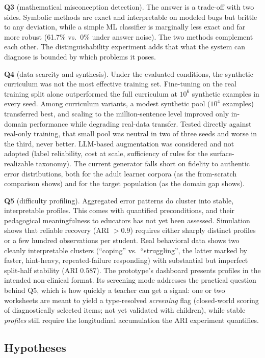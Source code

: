 \textbf{Q3} (mathematical misconception detection). The answer is a trade-off with two sides. Symbolic methods are exact and interpretable on modeled bugs but brittle to any deviation, while a simple ML classifier is marginally less exact and far more robust (61.7\% vs.\ 0\% under answer noise). The two methods complement each other. The distinguishability experiment adds that what the system can diagnose is bounded by which problems it poses.

\textbf{Q4} (data scarcity and synthesis). Under the evaluated conditions, the synthetic curriculum was not the most effective training set. Fine-tuning on the real training split alone outperformed the full curriculum at $10^6$ synthetic examples in every seed. Among curriculum variants, a modest synthetic pool ($10^4$ examples) transferred best, and scaling to the million-sentence level improved only in-domain performance while degrading real-data transfer. Tested directly against real-only training, that small pool was neutral in two of three seeds and worse in the third, never better. LLM-based augmentation was considered and not adopted (label reliability, cost at scale, sufficiency of rules for the surface-realizable taxonomy). The current generator falls short on fidelity to authentic error distributions, both for the adult learner corpora (as the from-scratch comparison shows) and for the target population (as the domain gap shows).

\textbf{Q5} (difficulty profiling). Aggregated error patterns do cluster into stable, interpretable profiles. This comes with quantified preconditions, and their pedagogical meaningfulness to educators has not yet been assessed. Simulation shows that reliable recovery (ARI $> 0.9$) requires either sharply distinct profiles or a few hundred observations per student. Real behavioral data shows two cleanly interpretable clusters (``coping'' vs.\ ``struggling'', the latter marked by faster, hint-heavy, repeated-failure responding) with substantial but imperfect split-half stability (ARI 0.587). The prototype's dashboard presents profiles in the intended non-clinical format. Its screening mode addresses the practical question behind Q5, which is how quickly a teacher can get a signal: one or two worksheets are meant to yield a type-resolved \emph{screening} flag (closed-world scoring of diagnostically selected items; not yet validated with children), while stable \emph{profiles} still require the longitudinal accumulation the ARI experiment quantifies.

\subsection{Hypotheses}
\label{sec:concl_rq_hyp}

